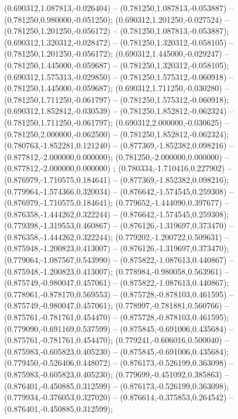  (0.690312,1.087813,-0.026404) -- (0.781250,1.087813,-0.053887) -- (0.781250,0.980000,-0.051250);
 (0.690312,1.201250,-0.027524) -- (0.781250,1.201250,-0.056172) -- (0.781250,1.087813,-0.053887);
 (0.690312,1.320312,-0.028472) -- (0.781250,1.320312,-0.058105) -- (0.781250,1.201250,-0.056172);
 (0.690312,1.445000,-0.029247) -- (0.781250,1.445000,-0.059687) -- (0.781250,1.320312,-0.058105);
 (0.690312,1.575313,-0.029850) -- (0.781250,1.575312,-0.060918) -- (0.781250,1.445000,-0.059687);
 (0.690312,1.711250,-0.030280) -- (0.781250,1.711250,-0.061797) -- (0.781250,1.575312,-0.060918);
 (0.690312,1.852812,-0.030539) -- (0.781250,1.852812,-0.062324) -- (0.781250,1.711250,-0.061797);
 (0.690312,2.000000,-0.030625) -- (0.781250,2.000000,-0.062500) -- (0.781250,1.852812,-0.062324);
 (0.780763,-1.852281,0.121240) -- (0.877369,-1.852382,0.098216) -- (0.877812,-2.000000,0.000000);
 (0.781250,-2.000000,0.000000) -- (0.877812,-2.000000,0.000000) ;
 (0.780334,-1.710416,0.227902) -- (0.876979,-1.710575,0.184641) -- (0.877369,-1.852382,0.098216);
 (0.779964,-1.574366,0.320034) -- (0.876642,-1.574545,0.259308) -- (0.876979,-1.710575,0.184641);
 (0.779652,-1.444090,0.397677) -- (0.876358,-1.444262,0.322244) -- (0.876642,-1.574545,0.259308);
 (0.779398,-1.319553,0.460867) -- (0.876126,-1.319697,0.373470) -- (0.876358,-1.444262,0.322244);
 (0.779202,-1.200722,0.509631) -- (0.875948,-1.200823,0.413007) -- (0.876126,-1.319697,0.373470);
 (0.779064,-1.087567,0.543990) -- (0.875822,-1.087613,0.440867) -- (0.875948,-1.200823,0.413007);
 (0.778984,-0.980058,0.563961) -- (0.875749,-0.980047,0.457061) -- (0.875822,-1.087613,0.440867);
 (0.778961,-0.878170,0.569553) -- (0.875728,-0.878103,0.461595) -- (0.875749,-0.980047,0.457061);
 (0.778997,-0.781881,0.560766) -- (0.875761,-0.781761,0.454470) -- (0.875728,-0.878103,0.461595);
 (0.779090,-0.691169,0.537599) -- (0.875845,-0.691006,0.435684) -- (0.875761,-0.781761,0.454470);
 (0.779241,-0.606016,0.500040) -- (0.875983,-0.605823,0.405230) -- (0.875845,-0.691006,0.435684);
 (0.779450,-0.526406,0.448072) -- (0.876173,-0.526199,0.363098) -- (0.875983,-0.605823,0.405230);
 (0.779699,-0.451092,0.385863) -- (0.876401,-0.450885,0.312599) -- (0.876173,-0.526199,0.363098);
 (0.779934,-0.376053,0.327020) -- (0.876614,-0.375853,0.264542) -- (0.876401,-0.450885,0.312599);
